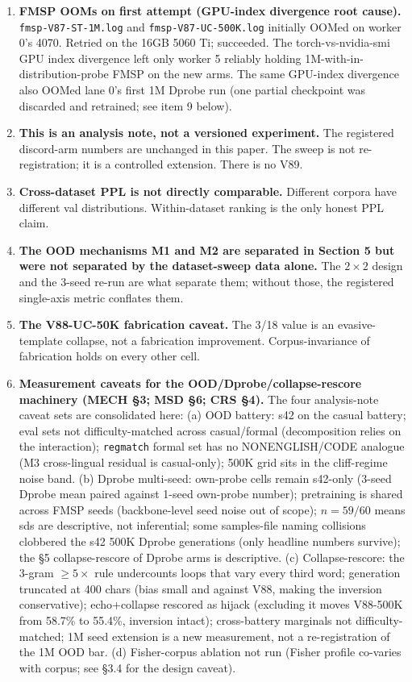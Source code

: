 \documentclass[11pt]{article}
\begin{document}
\begin{enumerate}
  \item \textbf{FMSP OOMs on first attempt (GPU-index divergence root cause).} \texttt{fmsp-V87-ST-1M.log} and \texttt{fmsp-V87-UC-500K.log} initially OOMed on worker 0's 4070. Retried on the 16GB 5060 Ti; succeeded. The torch-vs-nvidia-smi GPU index divergence left only worker 5 reliably holding 1M-with-in-distribution-probe FMSP on the new arms. The same GPU-index divergence also OOMed lane 0's first 1M Dprobe run (one partial checkpoint was discarded and retrained; see item 9 below).

  \item \textbf{This is an analysis note, not a versioned experiment.} The registered discord-arm numbers are unchanged in this paper. The sweep is not re-registration; it is a controlled extension. There is no V89.

  \item \textbf{Cross-dataset PPL is not directly comparable.} Different corpora have different val distributions. Within-dataset ranking is the only honest PPL claim.

  \item \textbf{The OOD mechanisms M1 and M2 are separated in Section 5 but were not separated by the dataset-sweep data alone.} The $2\times 2$ design and the 3-seed re-run are what separate them; without those, the registered single-axis metric conflates them.

  \item \textbf{The V88-UC-50K fabrication caveat.} The 3/18 value is an evasive-template collapse, not a fabrication improvement. Corpus-invariance of fabrication holds on every other cell.

  \item \textbf{Measurement caveats for the OOD/Dprobe/collapse-rescore machinery (MECH \S3; MSD \S6; CRS \S4).} The four analysis-note caveat sets are consolidated here: (a) OOD battery: s42 on the casual battery; eval sets not difficulty-matched across casual/formal (decomposition relies on the interaction); \texttt{regmatch} formal set has no NONENGLISH/CODE analogue (M3 cross-lingual residual is casual-only); 500K grid sits in the cliff-regime noise band. (b) Dprobe multi-seed: own-probe cells remain s42-only (3-seed Dprobe mean paired against 1-seed own-probe number); pretraining is shared across FMSP seeds (backbone-level seed noise out of scope); $n = 59/60$ means sds are descriptive, not inferential; some samples-file naming collisions clobbered the s42 500K Dprobe generations (only headline numbers survive); the \S5 collapse-rescore of Dprobe arms is descriptive. (c) Collapse-rescore: the 3-gram $\geq 5\times$ rule undercounts loops that vary every third word; generation truncated at 400 chars (bias small and against V88, making the inversion conservative); echo+collapse rescored as hijack (excluding it moves V88-500K from 58.7\% to 55.4\%, inversion intact); cross-battery marginals not difficulty-matched; 1M seed extension is a new measurement, not a re-registration of the 1M OOD bar. (d) Fisher-corpus ablation not run (Fisher profile co-varies with corpus; see \S3.4 for the design caveat).


\end{enumerate}
\end{document}

